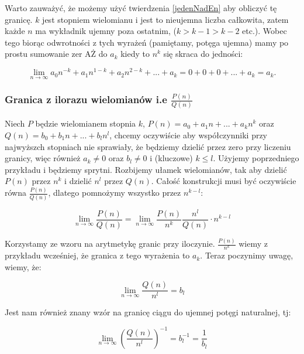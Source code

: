 \documentclass[a4paper,oneside,openright,11pt]{article}
\numberwithin{equation}{section}
\begin{document}
Warto zauważyć, że możemy użyć twierdzenia \ref{jedenNadEn} aby obliczyć tę granicę. $k$ jest stopniem wielomianu i jest to nieujemna liczba całkowita, zatem każde $n$ ma wykładnik ujemny poza ostatnim, ($k > k - 1 > k - 2$ etc.).
Wobec tego biorąc odwrotności z tych wyrażeń (pamiętamy, potęga ujemna) mamy po prostu sumowanie zer AŻ do $a_k$ kiedy to $n^k$ się skraca do jedności:

\begin{equation*}
    \lim_{n\to\infty} a_{0}n^{-k} + a_{1}n^{1-k} + a_{2}n^{2-k} + \mbox{...} + a_{k} = 0 + 0 + 0 + \mbox{...} + a_k = a_k.
\end{equation*}

\subsubsection{Granica z ilorazu wielomianów i.e $\frac{P(n)}{Q(n)}$}

Niech $P$ będzie wielomianem stopnia $k$, $P(n) = a_{0} + a_{1}n + \mbox{...} + a_{k}n^{k}$ oraz $Q(n) = b_{0} + b_{1}n + \mbox{...} + b_{l}n^{l}$, chcemy oczywiście aby współczynniki przy najwyższch stopniach nie sprawiały, że 
będziemy dzielić przez zero przy liczeniu granicy, więc również $a_k \neq 0$ oraz $b_l \neq 0$ i (kluczowe) $k \leq l$. Użyjemy poprzedniego przykładu i będziemy sprytni. Rozbijemy ułamek wielomianów, tak
aby dzielić $P(n)$ przez $n^k$ i dzielić $n^l$ przez $Q(n)$. Całość konstrukcji musi być oczywiście równa $\frac{P(n)}{Q(n)}$, dlatego  pomnożymy wszystko przez $n^{k-l}$:

\begin{equation*}
    \lim_{n\to\infty} \frac{P(n)}{Q(n)} = \lim_{n\to\infty} \frac{P(n)}{n^k} \frac{n^l}{Q(n)} \cdot n^{k-l}
\end{equation*}

Korzystamy ze wzoru na arytmetykę granic przy iloczynie. $\frac{P(n)}{n^k}$ wiemy z przykładu wcześniej, że granica z tego wyrażenia to $a_k$.
\vspace{5mm}
Teraz poczynimy uwagę, wiemy, że: 

\begin{equation*}
    \lim_{n\to\infty} \frac{Q(n)}{n^l} = b_l
\end{equation*}

Jest nam również znany wzór na granicę ciągu do ujemnej potęgi naturalnej, tj:

\begin{equation*}
    \lim_{n\to\infty} (\frac{Q(n)}{n^l})^{-1} = b_l^{-1} = \frac{1}{b_l}
\end{equation*}
\end{document}

